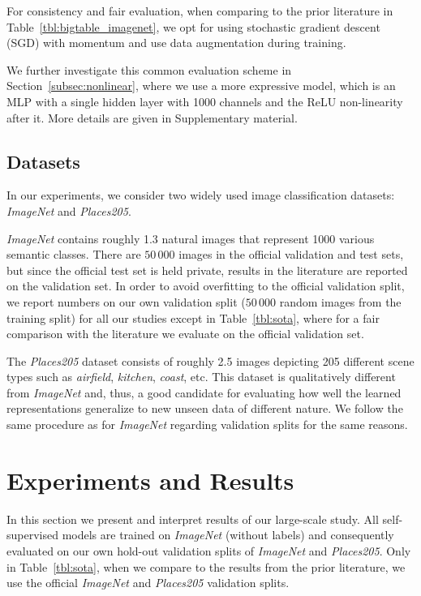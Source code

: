\documentclass[10pt,twocolumn,letterpaper]{article}
\begin{document}
For consistency and fair evaluation, when comparing to the prior literature in Table~\ref{tbl:bigtable_imagenet}, we opt for using stochastic gradient descent (SGD) with momentum and use data augmentation during training.

We further investigate this common evaluation scheme in Section~\ref{subsec:nonlinear}, where we use a more expressive model, which is an MLP with a single hidden layer with 1000 channels and the ReLU non-linearity after it.
More details are given in Supplementary material.



\subsection{Datasets}\label{subsec:datasets}

In our experiments, we consider two widely used  image classification datasets: \emph{ImageNet} and \emph{Places205}.


\emph{ImageNet} contains roughly \SI{1.3}{} natural images that represent 1000 various semantic classes.
There are $50\,000$ images in the official validation and test sets, but since the official test set is held private, results in the literature are reported on the validation set.
In order to avoid overfitting to the official validation split, we report numbers on our own validation split ($50\,000$ random images from the training split) for all our studies except in Table~\ref{tbl:sota}, where for a fair comparison with the literature we evaluate on the official validation set.


The \emph{Places205} dataset consists of roughly \SI{2.5}{} images depicting 205 different scene types such as \emph{airfield}, \emph{kitchen}, \emph{coast}, etc.
This dataset is qualitatively different from \emph{ImageNet} and, thus, a good candidate for evaluating how well the learned representations generalize to new unseen data of different nature.
We follow the same procedure as for \emph{ImageNet} regarding validation splits for the same reasons.


\section{Experiments and Results}\label{sec:core}

In this section we present and interpret results of our large-scale study.
All self-supervised models are trained on \emph{ImageNet}  (without labels) and consequently evaluated on our own hold-out validation splits of \emph{ImageNet} and \emph{Places205}.
Only in Table~\ref{tbl:sota}, when we compare to the results from the prior literature, we use the official \emph{ImageNet} and \emph{Places205} validation splits.
\end{document}
